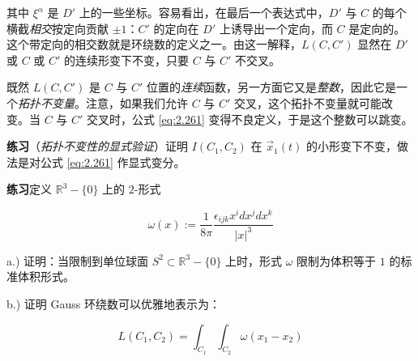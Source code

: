 其中 $\xi^\alpha$ 是 $D'$ 上的一些坐标。容易看出，在最后一个表达式中，$D'$ 与 $C$ 的每个横截\emph{相交}按定向贡献 $\pm1$：$C'$ 的定向在 $D'$ 上诱导出一个定向，而 $C$ 是定向的。这个带定向的相交数就是环绕数的定义之一。由这一解释，$L(C,C')$ 显然在 $D'$ 或 $C$ 或 $C'$ 的连续形变下不变，只要 $C$ 与 $C'$ 不交叉。

既然 $L(C,C')$ 是 $C$ 与 $C'$ 位置的\emph{连续}函数，另一方面它又是\emph{整数}，因此它是一个\emph{拓扑不变量}。注意，如果我们允许 $C$ 与 $C'$ 交叉，这个拓扑不变量就可能改变。当 $C$ 与 $C'$ 交叉时，公式 \eqref{eq:2.261} 变得不良定义，于是这个整数可以跳变。

\medskip
\noindent\textbf{练习}（\emph{拓扑不变性的显式验证}）\quad 证明 $I(C_1,C_2)$ 在 $\vec x_1(t)$ 的小形变下不变，做法是对公式 \eqref{eq:2.261} 作显式变分。

\medskip
\noindent\textbf{练习}\quad 定义 $\mathbb{R}^3-\{0\}$ 上的 $2$-形式

\begin{equation}
  \omega(x):=\frac{1}{8\pi}\frac{\epsilon_{ijk}x^idx^jdx^k}{|x|^3}
  \tag{2.264}
  \label{eq:2.264}
\end{equation}

a.) 证明：当限制到单位球面 $S^2\subset\mathbb{R}^3-\{0\}$ 上时，形式 $\omega$ 限制为体积等于 $1$ 的标准体积形式。

b.) 证明 Gauss 环绕数可以优雅地表示为：

\begin{equation}
  L(C_1,C_2)=\int_{C_1}\int_{C_2}\omega(x_1-x_2)
  \tag{2.265}
  \label{eq:2.265}
\end{equation}

\medskip
